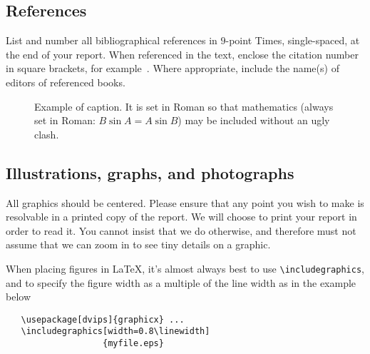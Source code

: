 \documentclass[10pt,twocolumn,letterpaper]{article}
\begin{document}
\subsection{References}

List and number all bibliographical references in $9$-point Times, single-spaced,
at the end of your report. When referenced in the text, enclose the citation
number in square brackets, for example~\cite{Authors14}.  Where appropriate,
include the name(s) of editors of referenced books.

\begin{figure}[t]
\begin{center}
\fbox{\rule{0pt}{1.8in} \rule{0.9\linewidth}{0pt}}
\end{center}
   \caption{Example of caption.  It is set in Roman so that mathematics
   (always set in Roman: $B \sin A = A \sin B$) may be included without an
   ugly clash.}
\label{fig:long}
\label{fig:onecol}
\end{figure}

\subsection{Illustrations, graphs, and photographs}

All graphics should be centered.  Please ensure that any point you wish to make is resolvable in a printed copy of the report. We will choose to print your report in order to read it.  You cannot insist that we do otherwise, and therefore must not assume that we can zoom in to see tiny details on a graphic.

When placing figures in \LaTeX, it's almost always best to use \verb+\includegraphics+, and to specify the  figure width as a multiple of the line width as in the example below
{\small\begin{verbatim}
   \usepackage[dvips]{graphicx} ...
   \includegraphics[width=0.8\linewidth]
                   {myfile.eps}
\end{verbatim}
}


{\small


}
\end{document}
